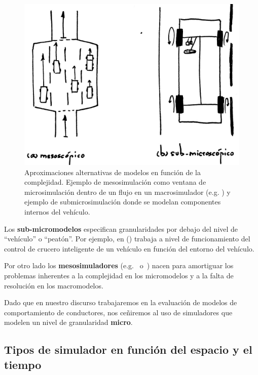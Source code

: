 \begin{figure}
	\centering
	\includegraphics{images/mesoscopic-and-submicroscopic-simulation}
	\caption{Aproximaciones alternativas de modelos en función de la complejidad. Ejemplo de mesosimulación como ventana de microsimulación dentro de un flujo en un macrosimulador (e.g. \cite{munoz2001integrated}) y ejemplo de submicrosimulación donde se modelan componentes internos del vehículo.}
	\label{fig:mesoscopic-and-submicroscopic-simulation}
\end{figure}

Los \textbf{sub-micromodelos} especifican granularidades por debajo del nivel de \enquote{vehículo} o \enquote{peatón}. Por ejemplo, en (\cite{Minderhoud1999}) trabaja a nivel de funcionamiento del control de crucero inteligente de un vehículo en función del entorno del vehículo.

Por otro lado los \textbf{mesosimuladores} (e.g.~\cite{munoz2001integrated} o~\cite{casas2011need}) nacen para amortiguar los problemas inherentes a la complejidad en los micromodelos y a la falta de resolución en los macromodelos.

Dado que en nuestro discurso trabajaremos en la evaluación de modelos de comportamiento de conductores, nos ceñiremos al uso de simuladores que modelen un nivel de granularidad \textbf{micro}.

\subsection{Tipos de simulador en función del espacio y el tiempo}

